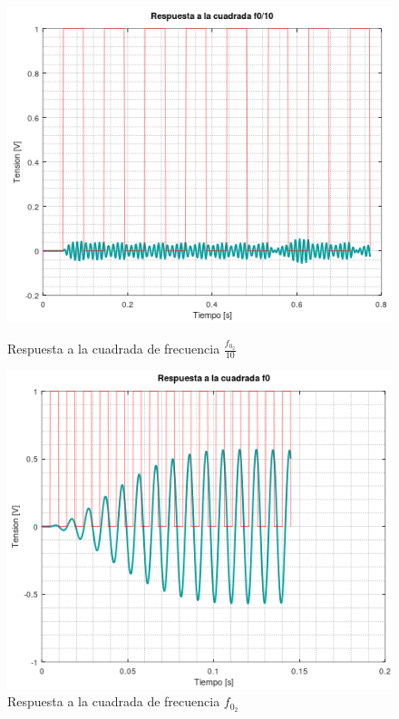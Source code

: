 \documentclass[11pt,a4paper]{report}
\begin{document}
\begin{figure}[t!]
\includegraphics[scale=0.95]{RtaCuadradaWo21.png}
\caption{Respuesta a la cuadrada de frecuencia $\frac{f_{0_{2}}}{10}$}
\includegraphics[scale=0.95]{RtaCuadradaWo22.png}
\caption{Respuesta a la cuadrada de frecuencia $f_{0_{2}}$}
\end{figure}
\end{document}

